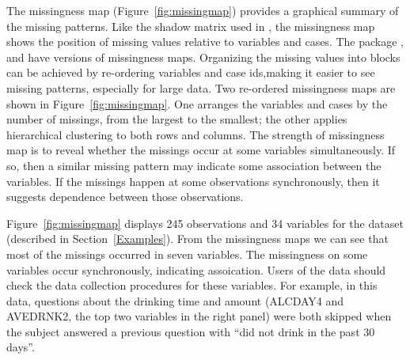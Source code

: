 \documentclass[article]{jss}
\begin{document}
The missingness map (Figure~\ref{fig:missingmap}) provides a graphical summary of the missing patterns. Like the shadow matrix used in , the missingness map shows the position of missing values relative to variables and cases. The  package  \citep{amelia}, and  \citep{VIM} have versions of missingness maps. Organizing the missing values into blocks can be achieved by re-ordering variables and case ids,making it easier to see missing patterns, especially for large data. Two re-ordered missingness maps are shown in Figure~\ref{fig:missingmap}. One arranges the variables and cases by the number of missings, from the largest to the smallest; the other applies hierarchical clustering to both rows and columns. The strength of missingness map is to reveal whether the missings occur at some variables simultaneously. If so, then a similar missing pattern may indicate some association between the variables. If the missings happen at some observations synchronously, then it suggests dependence between those observations.

Figure~\ref{fig:missingmap} displays 245 observations and 34 variables for the dataset  (described in Section~\ref{Examples}). From the missingness maps we can see that most of the missings occurred in seven variables. The missingness on some variables occur synchronously, indicating assoication. Users of the data should check the data collection procedures for these variables. For example, in this data, questions about the drinking time and amount (ALCDAY4 and AVEDRNK2, the top two variables in the right panel) were both skipped when the subject answered a previous question with ``did not drink in the past 30 days''. 
\end{document}
